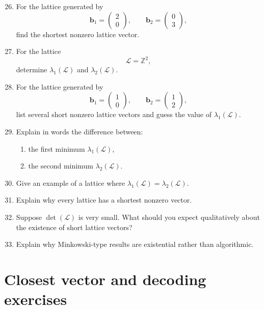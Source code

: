 \documentclass[11pt]{article}
\begin{document}
\begin{enumerate}
	\setcounter{enumi}{25}
	\item For the lattice generated by
	\[
	\mathbf{b}_1=
	\begin{pmatrix}
		2\\0
	\end{pmatrix},
	\qquad
	\mathbf{b}_2=
	\begin{pmatrix}
		0\\3
	\end{pmatrix},
	\]
	find the shortest nonzero lattice vector.
	
	\item For the lattice
	\[
	\mathcal{L}=\mathbb{Z}^2,
	\]
	determine \(\lambda_1(\mathcal{L})\) and \(\lambda_2(\mathcal{L})\).
	
	\item For the lattice generated by
	\[
	\mathbf{b}_1=
	\begin{pmatrix}
		1\\0
	\end{pmatrix},
	\qquad
	\mathbf{b}_2=
	\begin{pmatrix}
		1\\2
	\end{pmatrix},
	\]
	list several short nonzero lattice vectors and guess the value of \(\lambda_1(\mathcal{L})\).
	
	\item Explain in words the difference between:
	\begin{enumerate}
		\item the first minimum \(\lambda_1(\mathcal{L})\),
		\item the second minimum \(\lambda_2(\mathcal{L})\).
	\end{enumerate}
	
	\item Give an example of a lattice where \(\lambda_1(\mathcal{L})=\lambda_2(\mathcal{L})\).
	
	\item Explain why every lattice has a shortest nonzero vector.
	
	\item Suppose \(\det(\mathcal{L})\) is very small. What should you expect qualitatively about the existence of short lattice vectors?
	
	\item Explain why Minkowski-type results are existential rather than algorithmic.
\end{enumerate}

\section{Closest vector and decoding exercises}
\end{document}

